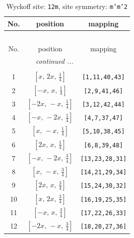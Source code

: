 \documentclass[fleqn,8pt]{jsarticle}
\begin{document}
\begin{longtable}{ccc}
\caption{Wyckoff site: {\tt 12m}, site symmetry: {\tt m'm'2}}
 \\
 \hline \hline
No. & position & mapping \\ \hline \endfirsthead

\multicolumn{2}{l}{\tablename\ \thetable{}} \\
 \hline \hline
No. & position & mapping \\ \hline \endhead

 \hline \hline
\multicolumn{2}{r}{\footnotesize\it continued ...} \\ \endfoot

 \hline \hline
\multicolumn{2}{r}{} \\ \endlastfoot

1 & $\left[ x,\, 2 x,\, \frac{1}{4} \right]$ & {\tt [1,11,40,43]} \\ \hline
2 & $\left[ - x,\, x,\, \frac{1}{4} \right]$ & {\tt [2,9,41,46]} \\ \hline
3 & $\left[ - 2 x,\, - x,\, \frac{1}{4} \right]$ & {\tt [3,12,42,44]} \\ \hline
4 & $\left[ - x,\, - 2 x,\, \frac{1}{4} \right]$ & {\tt [4,7,37,47]} \\ \hline
5 & $\left[ x,\, - x,\, \frac{1}{4} \right]$ & {\tt [5,10,38,45]} \\ \hline
6 & $\left[ 2 x,\, x,\, \frac{1}{4} \right]$ & {\tt [6,8,39,48]} \\ \hline
7 & $\left[ - x,\, - 2 x,\, \frac{3}{4} \right]$ & {\tt [13,23,28,31]} \\ \hline
8 & $\left[ x,\, - x,\, \frac{3}{4} \right]$ & {\tt [14,21,29,34]} \\ \hline
9 & $\left[ 2 x,\, x,\, \frac{3}{4} \right]$ & {\tt [15,24,30,32]} \\ \hline
10 & $\left[ x,\, 2 x,\, \frac{3}{4} \right]$ & {\tt [16,19,25,35]} \\ \hline
11 & $\left[ - x,\, x,\, \frac{3}{4} \right]$ & {\tt [17,22,26,33]} \\ \hline
12 & $\left[ - 2 x,\, - x,\, \frac{3}{4} \right]$ & {\tt [18,20,27,36]} \\
\end{longtable}
\renewcommand{\arraystretch}{1.2}
\end{document}
